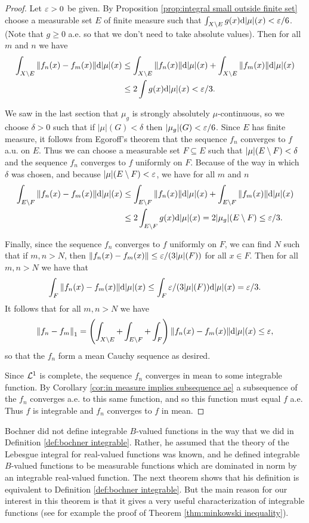 \begin{proof}
Let $\varepsilon>0$ be given. By Proposition \ref{prop:integral small outside finite set} choose a measurable set $E$ of finite measure such that $\int_{X\setminus E}g(x)\dd|\mu|(x)<\varepsilon/6$. (Note that $g \geq 0$ a.e. so that we don't need to take absolute values). Then for all $m$ and $n$ we have
\begin{align*}
    \int_{X\setminus E}\norm{f_n(x)-f_m(x)}\dd|\mu|(x)&\leq\int_{X\setminus E}\norm{f_n(x)}\dd|\mu|(x)+\int_{X\setminus E}\norm{f_m(x)}\dd|\mu|(x)\\
    &\leq2\int g(x)\dd|\mu|(x)<\varepsilon/3.
\end{align*}

We saw in the last section that $\mu_g$ is strongly absolutely $\mu$-continuous, so we choose $\delta>0$ such that if $|\mu|(G)<\delta$ then $|\mu_g|(G)<\varepsilon/6$. Since $E$ has finite measure, it follows from Egoroff's theorem that the sequence $f_n$ converges to $f$ a.u. on $E$. Thus we can choose a measurable set $F\subseteq E$ such that $|\mu|(E\setminus F)<\delta$ and the sequence $f_n$ converges to $f$ uniformly on $F$. Because of the way in which $\delta$ was chosen, and because $|\mu|(E\setminus F)<\varepsilon$, we have for all $m$ and $n$ 
\begin{align*}
    \int_{E\setminus F}\norm{f_n(x)-f_m(x)}\dd|\mu|(x)&\leq\int_{E\setminus F}\norm{f_n(x)}\dd|\mu|(x)+\int_{E\setminus F}\norm{f_m(x)}\dd|\mu|(x)\\
    &\leq2\int_{E\setminus F}g(x)\dd|\mu|(x)=2|\mu_g|(E\setminus F)\leq\varepsilon/3.
\end{align*}

Finally, since the sequence $f_n$ converges to $f$ uniformly on $F$, we can find $N$ such that if $m,n>N$, then $\norm{f_n(x)-f_m(x)}\leq\varepsilon/(3|\mu|(F))$ for all $x\in F$. Then for all $m,n>N$ we have that $$\int_F\norm{f_n(x)-f_m(x)}\dd|\mu|(x)\leq\int_F\varepsilon/(3|\mu|(F))\dd|\mu|(x)=\varepsilon/3.$$ It follows that for all $m,n>N$ we have $$\norm{f_n-f_m}_1=\left(\int_{X\setminus E}+\int_{E\setminus F}+\int_F\right)\norm{f_n(x)-f_m(x)}\dd|\mu|(x)\leq\varepsilon,$$ so that the $f_n$ form a mean Cauchy sequence as desired.

Since ${\cal L}^1$ is complete, the sequence $f_n$ converges in mean to some integrable function. By Corollary \ref{cor:in measure implies subsequence ae} a subsequence of the $f_n$ converges a.e. to this same function, and so this function must equal $f$ a.e. Thus $f$ is integrable and $f_n$ converges to $f$ in mean.
\end{proof}

Bochner did not define integrable $B$-valued functions in the way that we did in Definition \ref{def:bochner integrable}. Rather, he assumed that the theory of the Lebesgue integral for real-valued functions was known, and he defined integrable $B$-valued functions to be measurable functions which are dominated in norm by an integrable real-valued function. The next theorem shows that his definition is equivalent to Definition \ref{def:bochner integrable}. But the main reason for our interest in this theorem is that it gives a very useful characterization of integrable functions (see for example the proof of Theorem \ref{thm:minkowski inequality}).

